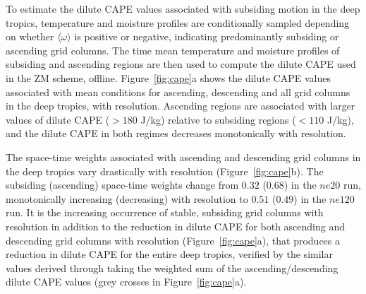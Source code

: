 \documentclass[times]{qjrms4}
\begin{document}
To estimate the dilute CAPE values associated with subsiding motion in the deep tropics, temperature and moisture profiles are conditionally sampled depending on whether $\langle \omega \rangle$ is positive or negative, indicating predominantly subsiding or ascending grid columns. The time mean temperature and moisture profiles of subsiding and ascending regions are then used to compute the dilute CAPE used in the ZM scheme, offline. Figure~\ref{fig:cape}a shows the dilute CAPE values associated with mean conditions for ascending, descending and all grid columns in the deep tropics, with resolution. Ascending regions are associated with larger values of dilute CAPE ($>180$ J/kg) relative to subsiding regions ($<110$ J/kg), and the dilute CAPE in both regimes decreases monotonically with resolution. 

The space-time weights associated with ascending and descending grid columns in the deep tropics vary drastically with resolution (Figure~\ref{fig:cape}b). The subsiding (ascending) space-time weights change from $0.32$ ($0.68$) in the $ne20$ run, monotonically increasing (decreasing) with resolution to $0.51$ ($0.49$) in the $ne120$ run. It is the increasing occurrence of stable, subsiding grid columns with resolution in addition to the reduction in dilute CAPE for both ascending and descending grid columns with resolution (Figure~\ref{fig:cape}a), that produces a reduction in dilute CAPE for the entire deep tropics, verified by the similar values derived through taking the weighted sum of the ascending/descending dilute CAPE values (grey crosses in Figure~\ref{fig:cape}a).
\end{document}
